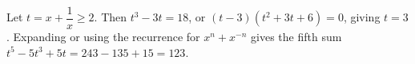 Let $t=x+\dfrac{1}{x}\ge2$. Then $t^3-3t=18$, or $(t-3)(t^2+3t+6)=0$, giving $t=3$. Expanding or using the recurrence for $x^n+x^{-n}$ gives the fifth sum $t^5-5t^3+5t=243-135+15=\boxed{123}$.
